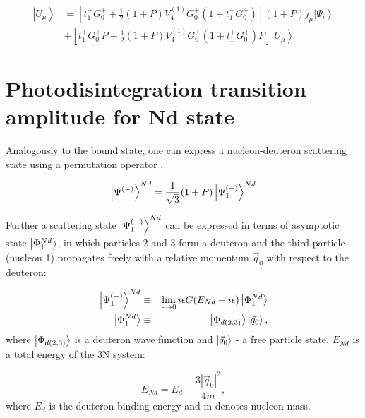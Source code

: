     \begin{equation}
        \begin{aligned}
            \left|U_\mu\right\rangle & =\left[t_1^{+} G_0^{+}+\frac{1}{2}(1+P) V_4^{(1)} G_0^{+}\left(1+t_1^{+} G_0^{+}\right)\right](1+P) j_\mu\left|\Psi_i\right\rangle \\
            & +\left[t_1^{+} G_0^{+} P+\frac{1}{2}(1+P) V_4^{(1)} G_0^{+}\left(1+t_1^{+} G_0^{+}\right) P\right]\left|U_\mu\right\rangle
            \end{aligned}
        \label{u_mu}
    \end{equation}



\section{Photodisintegration transition amplitude for Nd state}
\label{nd_state}

    Analogously to the bound state, one can express a nucleon-deuteron
    scattering state
    using a permutation operator .

    \begin{equation}
        \ket{\Psi^{(-)}}^{Nd} = \frac{1}{\sqrt{3}}(1+P)\ket{\Psi^{(-)}_1}^{Nd}    
    \end{equation}

    Further a scattering state $\ket{\Psi^{(-)}_1}^{Nd}$ can be expressed
    in terms of asymptotic state $\ket{\Phi^{Nd}_1}$, in which particles
    2 and 3 form a deuteron and the third particle (nucleon 1)
     propagates freely with a relative momentum $\vec{q}_0$ with 
    respect to the deuteron:

    \begin{eqnarray}
        \ket{\Psi^{(-)}_1}^{Nd} &\equiv& \lim_{\epsilon \rightarrow 0} 
        i \epsilon G(E_{Nd} - i\epsilon)\ket{\Phi^{Nd}_1}\\
        \ket{\Phi^{Nd}_1} &\equiv& \ket{\Phi_{d(2,3)}}\ket{\vec{q}_0},
    \end{eqnarray}
    where $\ket{\Phi_{d(2,3)}}$ is a deuteron wave function and 
    $\ket{\vec{q}_0}$ - a free particle state. $E_{Nd}$
    is a total energy of the 3N system:

    \begin{equation}
        E_{Nd} = E_d + \frac{3 |\vec{q}_0|^2}{4m},
    \end{equation}
    where $E_d$ is the deuteron binding energy and m denotes nucleon mass. 

